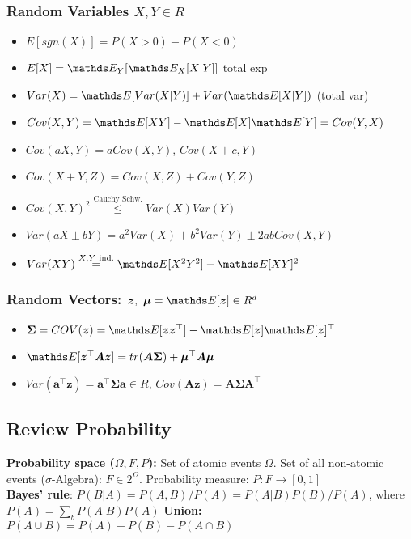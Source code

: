 \subsubsection{Random Variables $X,Y \in R$} \label{random vars}
\begin{itemize}
    \item $E[sgn(X)] = P(X>0)-P(X<0)$
    \item $E[X] = \E[Y]{\E[X]{X|Y}}$ total exp
    \item $Var(X) = \E {Var(X|Y)} + Var(\E {X|Y})$ (total var)
    \item $Cov(X,Y) = \E {XY} - \E {X}\E {Y} = Cov(Y,X)$
    \item $Cov(aX,Y) = aCov(X,Y)$, $Cov(X +c,Y)$
    \item $Cov(X+Y, Z) = Cov(X,Z) + Cov(Y,Z)$
    \item $Cov(X,Y)^{2} \overset{\text{Cauchy Schw.}}{\leq} Var(X)Var(Y)$
    \item $Var(aX \pm bY) = a^{2}Var(X)+b^{2}Var(Y) \pm 2abCov(X,Y)$
    \item $Var(XY) \overset{X,Y \text{ ind.}}{=} \E {X^{2}Y^{2}} - \E {XY}^{2}$
\end{itemize}
\subsubsection{Random Vectors: $\bm{z},\ \bm{\mu}= \E {\bm{z}} \in R^{d}$}
\begin{itemize}
    \item $\bm{\Sigma} = COV(\bm{z}) = \E {\bm{z}\bm{z}^{\top}} - \E {\bm{z}} \E {\bm{z}}^{\top}$
    \item $\E {\bm{z}^{\top}\bm{A}\bm{z}} = tr(\bm{A}\bm{\Sigma}) + \bm{\mu}^{\top}\bm{A}\bm{\mu}$
    \item $Var(\bm{a}^{\top}\bm{z}) = \bm{a}^{\top}\bm{\Sigma}\bm{a} \in R$, $Cov(\bm{A}\bm{z}) = \bm{A}\bm{\Sigma}\bm{A}^{\top}$
\end{itemize}


\subsection{Review Probability}
\textbf{Probability space ($\Omega, F, P$):}
Set of atomic events $\Omega$.
Set of all non-atomic events ($\sigma$-Algebra): $F \in 2^{\Omega}$.
Probability measure: $P: F \rightarrow [0,1]$\\
\textbf{Bayes' rule}: $P(B|A)= P(A,B)/P(A)=P(A|B)P(B)/P(A)$, where $P(A)=\sum_bP(A|B)P(A)$
\textbf{Union:} $P(A\cup B)=P(A)+P(B)-P(A\cap B)$

